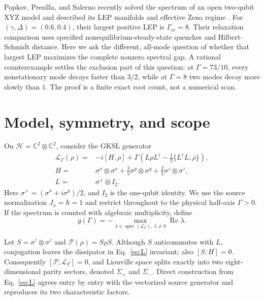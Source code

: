 \documentclass[aps,pra,reprint,superscriptaddress,nofootinbib]{revtex4-2}
\newcommand{\LL}{\mathcal{L}}
\newcommand{\CC}{\mathbb{C}}
\begin{document}
Popkov, Presilla, and Salerno recently solved the spectrum of an open
two-qubit XYZ model and described its LEP manifolds and effective Zeno regime
\cite{Popkov2025}.  For $(\gamma,\Delta)=(0.6,0.4)$, their largest positive LEP
is $\Gamma_{\mathrm{cr}}=8$.  Their relaxation comparison uses specified
nonequilibrium-steady-state quenches and Hilbert--Schmidt distance.  Here we
ask the different, all-mode question of whether that largest LEP maximizes the
complete nonzero spectral gap.  A rational counterexample settles the
exclusion part of this question: at $\Gamma=73/10$, every nonstationary mode
decays faster than $3/2$, while at $\Gamma=8$ two modes decay more slowly than
$1$.  The proof is a finite exact root count, not a numerical scan.

\section{Model, symmetry, and scope}

On $\mathcal H=\CC^2\otimes\CC^2$, consider the GKSL generator
\cite{Gorini1976,Lindblad1976}
\begin{align}
 \LL_\Gamma(\rho)={}&-i[H,\rho]
 +\Gamma\left(L\rho L^\dagger-\frac12\{L^\dagger L,\rho\}\right),            \label{eq:L}\\
 H={}&\sigma^x\otimes\sigma^x+\frac35\sigma^y\otimes\sigma^y
       +\frac25\sigma^z\otimes\sigma^z,                                      \label{eq:H}\\
 L={}&\sigma^+\otimes I_2 .                                                   \label{eq:jump}
\end{align}
Here $\sigma^+=(\sigma^x+i\sigma^y)/2$, and $I_2$ is the one-qubit identity.
We use the source normalization $J_x=\hbar=1$ and restrict throughout to the
physical half-axis $\Gamma>0$.  If the spectrum is counted with algebraic
multiplicity, define
\begin{equation}
 g(\Gamma)=-\max_{\lambda\in\operatorname{spec}(\LL_\Gamma),\,\lambda\ne0}
                  \operatorname{Re}\lambda .                                 \label{eq:gap}
\end{equation}

Let $S=\sigma^z\otimes\sigma^z$ and
$\mathcal P(\rho)=S\rho S$.  Although $S$ anticommutes with $L$, conjugation
leaves the dissipator in Eq.~\eqref{eq:L} invariant; also $[S,H]=0$.
Consequently $[\mathcal P,\LL_\Gamma]=0$, and Liouville space splits exactly
into two eight-dimensional parity sectors, denoted $\Sigma_+$ and $\Sigma_-$.
Direct construction from Eq.~\eqref{eq:L} agrees entry by entry with the
vectorized source generator and reproduces its two characteristic factors.
\end{document}

